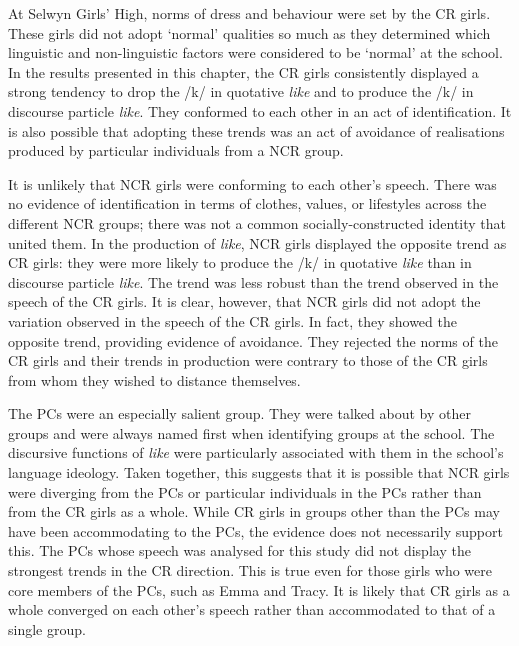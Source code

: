 At Selwyn Girls' High, norms of dress and behaviour were set by the CR girls.  These girls did not adopt `normal' qualities so much as they determined which linguistic and non-linguistic factors were considered to be `normal' at the school.  In the results presented in this chapter, the CR girls consistently displayed a strong tendency to drop the /k/ in quotative \textit{like} and to produce the /k/ in discourse particle \textit{like}.  They conformed to each other in an act of identification.  It is also possible that adopting these trends was an act of avoidance of realisations produced by particular individuals from a NCR group.

It is unlikely that NCR girls were conforming to each other's speech.  There was no evidence of identification in terms of clothes, values, or life\-styles across the different NCR groups; there was not a common so\-cially-con\-structed identity that united them.  In the production of \textit{like}, NCR girls displayed the opposite trend as CR girls: they were more likely to produce the /k/ in quotative \textit{like} than in discourse particle \textit{like}.  The trend was less robust than the trend observed in the speech of the CR girls.  It is clear, however, that NCR girls did not adopt the variation observed in the speech of the CR girls.  In fact, they showed the opposite trend, providing evidence of avoidance.  They rejected the norms of the CR girls and their trends in production were contrary to those of the CR girls from whom they wished to distance themselves.  

The PCs were an especially salient group.  They were talked about by other groups and were always named first when identifying groups at the school.  The discursive functions of \textit{like} were particularly associated with them in the school's language ideology.  Taken together, this suggests that it is possible that NCR girls were diverging from the PCs or particular individuals in the PCs rather than from the CR girls as a whole.  While CR girls in groups other than the PCs may have been accommodating to the PCs, the evidence does not necessarily support this.  The PCs whose speech was analysed for this study did not display the strongest trends in the CR direction.  This is true even for those girls who were core members of the PCs, such as Emma and Tracy.  It is likely that CR girls as a whole converged on each other's speech rather than accommodated to that of a single group.

